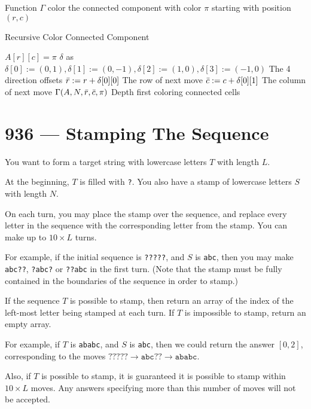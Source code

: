 Function $\Gamma$ color the connected component with color $\pi$ starting with position $(r,c)$
\begin{algorithm}[H]
\caption{Recursive Color Connected Component}
\begin{algorithmic}[1]
\State $A[r][c] = \pi$
\State $\delta$ as $\delta[0]:=(0,1), \delta[1]:=(0,-1), \delta[2]:=(1,0), \delta[3]:=(-1,0)$ \Comment The 4 direction offsets
\State $\Bar{r}:=r + \delta[0][0]$ \Comment The row of next move
\State $\Bar{c}:=c + \delta[0][1]$ \Comment The column of next move
\State $\Gamma(A, N, \Bar{r}, \Bar{c}, \pi)$ \Comment Depth first coloring connected cells
\EndIf
\EndFor
\EndFunction
\end{algorithmic}
\end{algorithm}

\section{936 --- Stamping The Sequence}
You want to form a target string with lowercase letters $T$ with length $L$.
\par
At the beginning, $T$ is filled with \texttt{?}.  You also have a stamp of lowercase letters $S$ with length $N$.
\par
On each turn, you may place the stamp over the sequence, and replace every letter in the sequence with the corresponding letter from the stamp.  You can make up to $10 \times L$ turns.
\par
For example, if the initial sequence is \texttt{?????}, and $S$ is \texttt{abc},  then you may make \texttt{abc??}, \texttt{?abc?} or \texttt{??abc} in the first turn.  (Note that the stamp must be fully contained in the boundaries of the sequence in order to stamp.)
\par
If the sequence $T$ is possible to stamp, then return an array of the index of the left-most letter being stamped at each turn. If $T$ is impossible to stamp, return an empty array.
\par
For example, if $T$ is \texttt{ababc}, and $S$ is \texttt{abc}, then we could return the answer $[0, 2]$, corresponding to the moves $\texttt{?????} \longrightarrow \texttt{abc??} \longrightarrow \texttt{ababc}$.
\par
Also, if $T$ is possible to stamp, it is guaranteed it is possible to stamp within $10 \times L$ moves.  Any answers specifying more than this number of moves will not be accepted.
